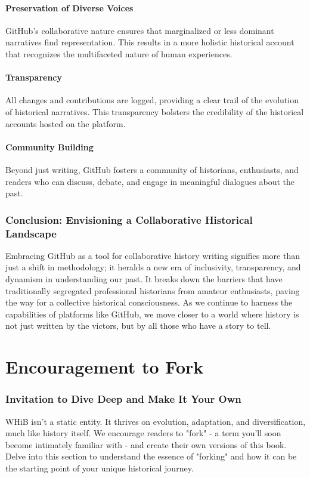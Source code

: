 \documentclass[a4paper,12pt]{book}
\begin{document}
\subsubsection*{Preservation of Diverse Voices}
GitHub's collaborative nature ensures that marginalized or less dominant narratives find representation. This results in a more holistic historical account that recognizes the multifaceted nature of human experiences.

\subsubsection*{Transparency}
All changes and contributions are logged, providing a clear trail of the evolution of historical narratives. This transparency bolsters the credibility of the historical accounts hosted on the platform.

\subsubsection*{Community Building}
Beyond just writing, GitHub fosters a community of historians, enthusiasts, and readers who can discuss, debate, and engage in meaningful dialogues about the past.

\subsection*{Conclusion: Envisioning a Collaborative Historical Landscape}
Embracing GitHub as a tool for collaborative history writing signifies more than just a shift in methodology; it heralds a new era of inclusivity, transparency, and dynamism in understanding our past. It breaks down the barriers that have traditionally segregated professional historians from amateur enthusiasts, paving the way for a collective historical consciousness. As we continue to harness the capabilities of platforms like GitHub, we move closer to a world where history is not just written by the victors, but by all those who have a story to tell.

\chapter{Encouragement to Fork}
\subsection*{Invitation to Dive Deep and Make It Your Own}
WHiB isn't a static entity. It thrives on evolution, adaptation, and diversification, much like history itself. We encourage readers to "fork" - a term you'll soon become intimately familiar with - and create their own versions of this book. Delve into this section to understand the essence of "forking" and how it can be the starting point of your unique historical journey.
\end{document}
